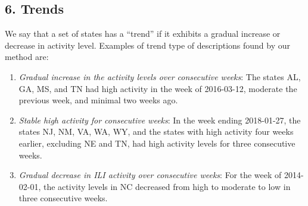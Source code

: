 \subsection*{6. Trends}
We say that a set of states has a ``trend'' if it exhibits a gradual increase or decrease in 
activity level. Examples of trend type of descriptions found by our method are:

\begin{enumerate}
\item \emph{Gradual increase in the activity levels over consecutive weeks}: 
The states AL, GA, MS, and TN
had high activity in the week of 2016-03-12, 
moderate the previous week, and minimal two weeks ago.
\item \emph{Stable high activity for consecutive weeks}: 
In the week ending 2018-01-27,
the states NJ, NM, VA, WA, WY, and the states 
with high activity four weeks earlier, excluding NE and TN, 
had high activity levels for three consecutive weeks.

\item \emph{Gradual decrease in ILI activity over consecutive weeks}: 
For the week of 2014-02-01, the activity levels in NC 
decreased from high to moderate to low in three consecutive weeks.
\end{enumerate}


